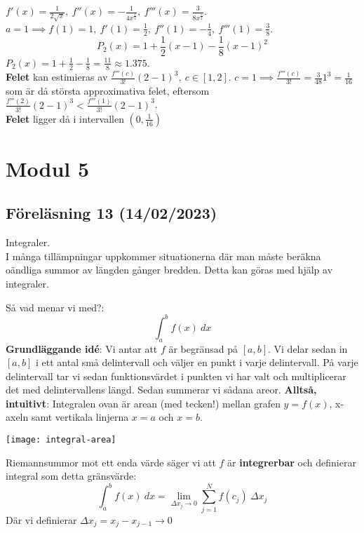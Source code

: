 \documentclass{report}
\begin{document}
\sol $ f'(x) = \frac{1}{2 \sqrt{x} },\: f''(x) = - \frac{1}{4 x^{ \frac{3}{2} }}, \: f'''(x) = \frac{3}{8 x^{ \frac{5}{2} }}  $. $ a = 1 \implies f(1) = 1, \: f'(1) = \frac{1}{2}, \: f''(1) = - \frac{1}{4}, \: f'''(1) = \frac{3}{8} $.
\begin{equation*}
P_2(x) = 1 + \frac{1}{2} (x-1) - \frac{1}{8} (x-1)^2  
\end{equation*}
$ P_2(x) = 1 + \frac{1}{2}  - \frac{1}{8} = \frac{11}{8} \approx 1.375 $.\\
\textbf{Felet} kan estimieras av $ \frac{f'''(c)}{3!} (2-1)^3, \: c \in [1,2]$. $ c = 1 \implies \frac{f'''(c)}{3!} = \frac{3}{48} 1^3 = \frac{1}{16} $ som är då största approximativa felet, eftersom $ \frac{f'''(2)}{3!} (2-1)^3 < \frac{f'''(1)}{3!} (2-1)^3 $.\\
\textbf{Felet} ligger då i intervallen $ (0, \frac{1}{16} ) $     


\pagebreak

\chapter{Modul 5}
\section{Föreläsning 13 (14/02/2023)}
Integraler.\\
\noindent
I många tillämpningar uppkommer situationerna där man måste beräkna oändliga summor av längden gånger bredden. Detta kan göras med hjälp av integraler.

{
Så vad menar vi med?:
\begin{equation*}
\int_{a}^{b} f(x) \: dx
\end{equation*}
\textbf{Grundläggande idé}: Vi antar att $ f $ är begränsad på $ [a,b] $. Vi delar sedan in $ [a,b] $ i ett antal små delintervall och väljer en punkt i varje delintervall. På varje delintervall tar vi sedan funktionsvärdet i punkten vi har valt och multiplicerar det med delintervallens längd. Sedan summerar vi sådana areor. \textbf{Alltså, intuitivt}: Integralen ovan är arean (med tecken!) mellan grafen $ y = f(x) $, x-axeln samt vertikala linjerna $ x=a $ och $ x=b $.  

\begin{center}
	\texttt{[image: integral-area]}
\end{center}

Riemannsummor mot ett enda värde säger vi att $ f $ är \textbf{integrerbar} och definierar integral som detta gränsvärde:
\begin{equation*}
\int_{a}^{b} f(x) \: dx = \lim_{\Delta x_j \to 0} \sum_{j = 1}^{N} f(c_j)\:\Delta x_j 
\end{equation*}
Där vi definierar $ \Delta x_j = x_j - x_{j-1} \to 0 $
}
\end{document}
